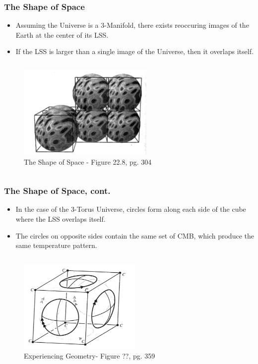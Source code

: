 \documentclass[13pt]{beamer}
\begin{document}
\begin{frame}
\frametitle{The Shape of Space}
  \begin{itemize}
    \item Assuming the Universe is a 3-Manifold, there exists reoccuring images of the Earth at the center of its LSS.
    \item If the LSS is larger than a single image of the Universe, then it overlaps itself.
  \end{itemize}

  \begin{columns}[c] %
     \centering
      \begin{figure}
        \includegraphics[height=4.5cm]{./img/LssIntersecting} %
        \caption{The Shape of Space - Figure 22.8, pg. 304}
      \end{figure}
  \end{columns}
\end{frame}

\begin{frame}
\frametitle{The Shape of Space, cont.}
  \begin{itemize}
    \item In the case of the 3-Torus Universe, circles form along each side of the cube where the LSS overlaps itself.
    \item The circles on opposite sides contain the same set of CMB, which produce the same temperature pattern.
  \end{itemize}

  \begin{columns}[c] %
     \centering
      \begin{figure}
        \includegraphics[height=4.5cm]{./img/shapeofspace} 
        \caption{Experiencing Geometry- Figure ??, pg. 359}
      \end{figure}
  \end{columns}
\end{frame}
\end{document}
